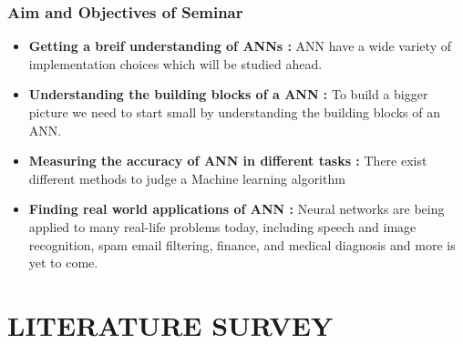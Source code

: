 \documentclass[12pt,times,a4paper]{report}
\begin{document}
{{\begin{normalsize}
\subsection{Aim and Objectives of Seminar}
\begin{itemize}
    \item \textbf{Getting a breif understanding of ANNs :} ANN have a wide variety of implementation choices which will be studied ahead.
    \item \textbf{Understanding the building blocks of a ANN :} To build a bigger picture we need to start small by understanding the building blocks of an ANN.
 \item\textbf{Measuring the accuracy of ANN in different tasks :} There exist different methods to judge a Machine learning algorithm 
\item \textbf{Finding real world applications of ANN :} Neural networks are being applied to many real-life problems today, including speech and image recognition, spam email filtering, finance, and medical diagnosis and more is yet to come.
\end{itemize}
\newpage
\chapter{\fontsize{18}{16}\textbf{LITERATURE SURVEY}}


\end{normalsize}}}
\end{document}

